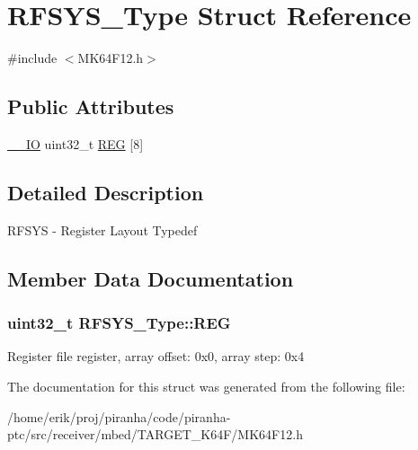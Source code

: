 \hypertarget{structRFSYS__Type}{}\section{R\+F\+S\+Y\+S\+\_\+\+Type Struct Reference}
\label{structRFSYS__Type}


{\ttfamily \#include $<$M\+K64\+F12.\+h$>$}

\subsection*{Public Attributes}
\begin{DoxyCompactItemize}
\item 
\hyperlink{core__sc300_8h_aec43007d9998a0a0e01faede4133d6be}{\+\_\+\+\_\+\+IO} uint32\+\_\+t \hyperlink{structRFSYS__Type_a511116607e801776701abe16884d22ed}{R\+EG} \mbox{[}8\mbox{]}
\end{DoxyCompactItemize}


\subsection{Detailed Description}
R\+F\+S\+YS -\/ Register Layout Typedef 

\subsection{Member Data Documentation}
\subsubsection[{\texorpdfstring{R\+EG}{REG}}]{ uint32\+\_\+t R\+F\+S\+Y\+S\+\_\+\+Type\+::\+R\+EG}\hypertarget{structRFSYS__Type_a511116607e801776701abe16884d22ed}{}\label{structRFSYS__Type_a511116607e801776701abe16884d22ed}
Register file register, array offset\+: 0x0, array step\+: 0x4 

The documentation for this struct was generated from the following file\+:\begin{DoxyCompactItemize}
\item 
/home/erik/proj/piranha/code/piranha-\/ptc/src/receiver/mbed/\+T\+A\+R\+G\+E\+T\+\_\+\+K64\+F/M\+K64\+F12.\+h\end{DoxyCompactItemize}
